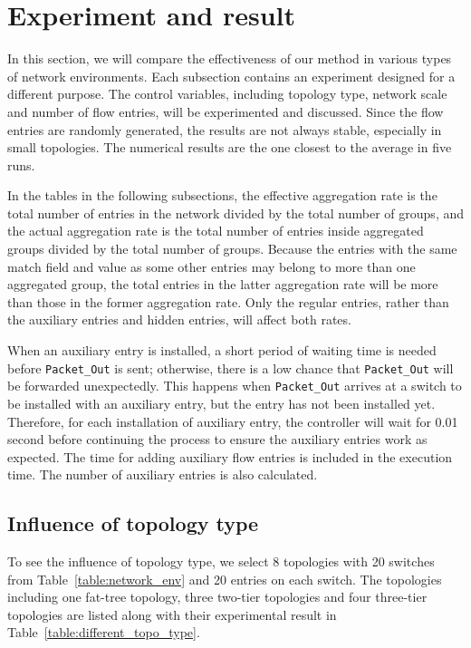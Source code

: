 \section{Experiment and result}
In this section, we will compare the effectiveness of our method in various types of network environments. Each subsection contains an experiment designed for a different purpose. The control variables, including topology type, network scale and number of flow entries, will be experimented and discussed. Since the flow entries are randomly generated, the results are not always stable, especially in small topologies. The numerical results are the one closest to the average in five runs.

In the tables in the following subsections, the effective aggregation rate is the total number of entries in the network divided by the total number of groups, and the actual aggregation rate is the total number of entries inside aggregated groups divided by the total number of groups. Because the entries with the same match field and value as some other entries may belong to more than one aggregated group, the total entries in the latter aggregation rate will be more than those in the former aggregation rate. Only the regular entries, rather than the auxiliary entries and hidden entries, will affect both rates.

When an auxiliary entry is installed, a short period of waiting time is needed before \texttt{Packet\_Out} is sent; otherwise, there is a low chance that \texttt{Packet\_Out} will be forwarded unexpectedly. This happens when \texttt{Packet\_Out} arrives at a switch to be installed with an auxiliary entry, but the entry has not been installed yet. Therefore, for each installation of auxiliary entry, the controller will wait for 0.01 second before continuing the process to ensure the auxiliary entries work as expected. The time for adding auxiliary flow entries is included in the execution time. The number of auxiliary entries is also calculated.

\subsection{Influence of topology type}
To see the influence of topology type, we select 8 topologies with 20 switches from Table~\ref{table:network_env} and 20 entries on each switch. The topologies including one fat-tree topology, three two-tier topologies and four three-tier topologies are listed along with their experimental result in Table~\ref{table:different_topo_type}. 

